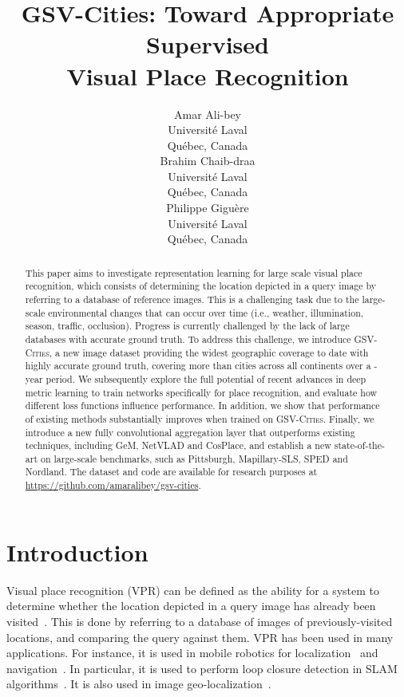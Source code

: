 \documentclass{article}
\title{GSV-Cities: Toward Appropriate Supervised \\Visual Place Recognition}
\author{ Amar Ali-bey\\
	Universit\'e Laval\\
	Qu\'ebec, Canada \\
	\And
	Brahim Chaib-draa \\
	Universit\'e Laval\\
	Qu\'ebec, Canada \\
	\And
	Philippe Gigu\`ere \\
	Universit\'e Laval \\
	Qu\'ebec, Canada \\
}
\date{}
\begin{document}
\maketitle

\begin{abstract}
This paper aims to investigate representation learning for large scale  visual place recognition, which consists of determining the location depicted in a query image by referring to a database of reference images. This is a challenging task due to the large-scale environmental changes that can occur over time (i.e., weather, illumination, season, traffic, occlusion). Progress is currently challenged by the lack of large databases with accurate ground truth. To address this challenge, we introduce \textsc{GSV-Cities}, a new image dataset providing the widest geographic coverage to date with highly accurate ground truth, covering more than  cities across all continents over a -year period.
We subsequently explore the full potential of recent advances in deep metric learning to train networks specifically for place recognition, and evaluate how different loss functions influence performance. In addition, we show that performance of existing methods substantially improves when trained on \textsc{GSV-Cities}.
Finally, we introduce a new fully convolutional aggregation layer that outperforms existing techniques, including GeM, NetVLAD and CosPlace, and establish a new state-of-the-art on large-scale benchmarks, such as Pittsburgh, Mapillary-SLS, SPED and Nordland. 
The dataset and code are available for research purposes at \url{https://github.com/amaralibey/gsv-cities}.
\end{abstract}

\vspace{15pt}

\vspace{15pt}
\section{Introduction}
Visual place recognition (VPR) can be defined as the ability for a system to determine whether the location depicted in a query image has already been visited~\cite{arandjelovic2016netvlad}.
This is done by referring to a database of images of previously-visited locations, and comparing the query against them.
VPR has been used in many applications. For instance, it is used in mobile robotics for localization~\cite{engelson1994passive, mur2015orb} and  navigation~\cite{matsumoto1996visual, milford2010persistent}. In particular, it is used to perform loop closure detection in SLAM algorithms~\cite{taketomi2017visual, hane20173d}. 
It is also used in image geo-localization~\cite{weyand2016planet}.
\end{document}
